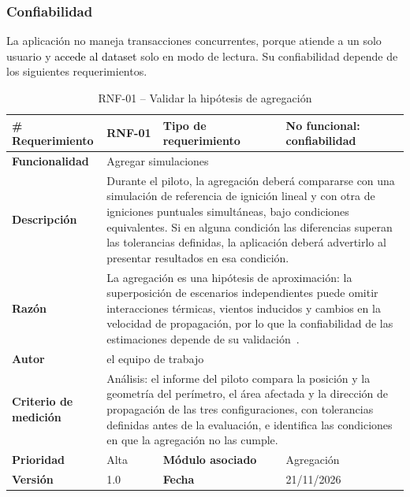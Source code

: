 \subsubsection{Confiabilidad}
La aplicación no maneja transacciones concurrentes, porque atiende a un solo usuario y \textcolor{black}{accede al dataset} solo en modo de lectura. Su confiabilidad depende de los siguientes requerimientos.

\begin{longtable}{|p{\rqA}|p{\rqB}|p{\rqC}|p{\rqD}|}
  \caption{RNF-01 -- Validar la hipótesis de agregación}\label{tab:rnf-01}\tabularnewline
  \hline
  \textbf{\# Requerimiento} & RNF-01 & \raggedright\textbf{Tipo de requerimiento} & No funcional: confiabilidad\tabularnewline\hline
  \raggedright\textbf{Funcionalidad} & \multicolumn{3}{p{\rqBCD}|}{Agregar simulaciones}\tabularnewline\hline
  \endfirsthead
  \textbf{Descripción} & \multicolumn{3}{p{\rqBCD}|}{Durante el piloto, la agregación deberá compararse con una simulación de referencia de ignición lineal y con otra de igniciones puntuales simultáneas, bajo condiciones equivalentes. Si en alguna condición las diferencias superan las tolerancias definidas, la aplicación deberá advertirlo al presentar resultados en esa condición.}\tabularnewline\hline
  \textbf{Razón} & \multicolumn{3}{p{\rqBCD}|}{La agregación es una hipótesis de aproximación: la superposición de escenarios independientes puede omitir interacciones térmicas, vientos inducidos y cambios en la velocidad de propagación, por lo que la confiabilidad de las estimaciones depende de su validación~\cite{vfp2026}.}\tabularnewline\hline
  \textbf{Autor} & \multicolumn{3}{p{\rqBCD}|}{el equipo de trabajo}\tabularnewline\hline
  \raggedright\textbf{Criterio de medición} & \multicolumn{3}{p{\rqBCD}|}{Análisis: el informe del piloto compara la posición y la geometría del perímetro, el área afectada y la dirección de propagación de las tres configuraciones, con tolerancias definidas antes de la evaluación, e identifica las condiciones en que la agregación no las cumple.}\tabularnewline\hline
  \textbf{Prioridad} & Alta & \raggedright\textbf{Módulo asociado} & Agregación\tabularnewline\hline
  \textbf{Versión} & 1.0 & \textbf{Fecha} & 21/11/2026\tabularnewline\hline
\end{longtable}

